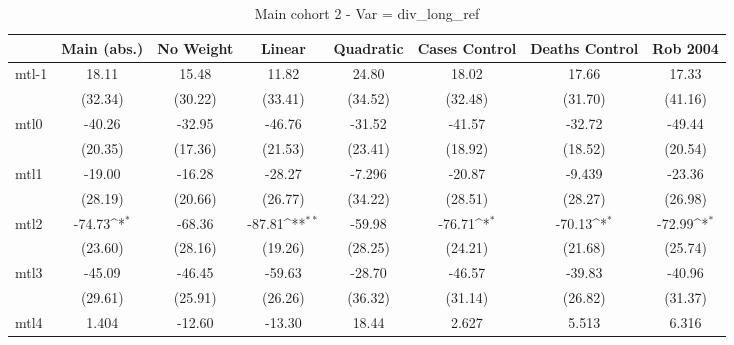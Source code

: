 \documentclass{article}
\begin{document}
{
\def\sym#1{\ifmmode^{#1}\else\(^{#1}\)\fi}
\begin{longtable}{l*{7}{c}}
\caption{Main cohort 2 - Var = div\_long\_ref}\\
\hline\hline\endfirsthead\hline\endhead\hline\endfoot\endlastfoot
                &\multicolumn{1}{c}{Main (abs.)}&\multicolumn{1}{c}{No Weight}&\multicolumn{1}{c}{Linear}&\multicolumn{1}{c}{Quadratic}&\multicolumn{1}{c}{Cases Control}&\multicolumn{1}{c}{Deaths Control}&\multicolumn{1}{c}{Rob 2004}\\
\hline
mtl-1           &    18.11         &    15.48         &    11.82         &    24.80         &    18.02         &    17.66         &    17.33         \\
                &  (32.34)         &  (30.22)         &  (33.41)         &  (34.52)         &  (32.48)         &  (31.70)         &  (41.16)         \\
mtl0            &   -40.26         &   -32.95         &   -46.76         &   -31.52         &   -41.57         &   -32.72         &   -49.44         \\
                &  (20.35)         &  (17.36)         &  (21.53)         &  (23.41)         &  (18.92)         &  (18.52)         &  (20.54)         \\
mtl1            &   -19.00         &   -16.28         &   -28.27         &   -7.296         &   -20.87         &   -9.439         &   -23.36         \\
                &  (28.19)         &  (20.66)         &  (26.77)         &  (34.22)         &  (28.51)         &  (28.27)         &  (26.98)         \\
mtl2            &   -74.73\sym{*}  &   -68.36         &   -87.81\sym{**} &   -59.98         &   -76.71\sym{*}  &   -70.13\sym{*}  &   -72.99\sym{*}  \\
                &  (23.60)         &  (28.16)         &  (19.26)         &  (28.25)         &  (24.21)         &  (21.68)         &  (25.74)         \\
mtl3            &   -45.09         &   -46.45         &   -59.63         &   -28.70         &   -46.57         &   -39.83         &   -40.96         \\
                &  (29.61)         &  (25.91)         &  (26.26)         &  (36.32)         &  (31.14)         &  (26.82)         &  (31.37)         \\
mtl4            &    1.404         &   -12.60         &   -13.30         &    18.44         &    2.627         &    5.513         &    6.316         \\

\end{longtable}}
\end{document}
